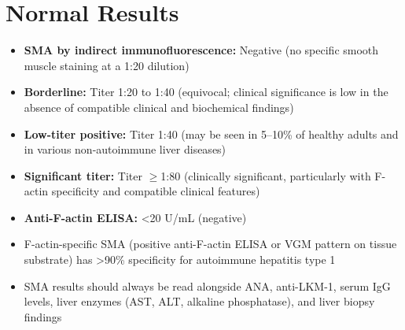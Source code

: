 \section*{Normal Results}
\begin{itemize}
  \item \textbf{SMA by indirect immunofluorescence:} Negative (no specific smooth muscle staining at a 1:20 dilution)
  \item \textbf{Borderline:} Titer 1:20 to 1:40 (equivocal; clinical significance is low in the absence of compatible clinical and biochemical findings)
  \item \textbf{Low-titer positive:} Titer 1:40 (may be seen in 5--10\% of healthy adults and in various non-autoimmune liver diseases)
  \item \textbf{Significant titer:} Titer $\geq$1:80 (clinically significant, particularly with F-actin specificity and compatible clinical features)
  \item \textbf{Anti-F-actin ELISA:} <20 U/mL (negative)
  \item F-actin-specific SMA (positive anti-F-actin ELISA or VGM pattern on tissue substrate) has >90\% specificity for autoimmune hepatitis type 1
  \item SMA results should always be read alongside ANA, anti-LKM-1, serum IgG levels, liver enzymes (AST, ALT, alkaline phosphatase), and liver biopsy findings
\end{itemize}

